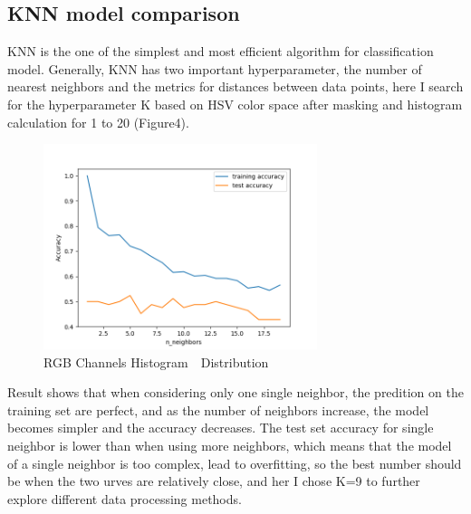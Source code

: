 \documentclass[11pt]{article}
\begin{document}
\subsection{KNN model comparison}
KNN is the one of the simplest and most efficient algorithm for classification model. Generally, KNN has two important hyperparameter, the number of nearest neighbors and the metrics for distances between data points, here I search for the hyperparameter K based on HSV color space after masking and histogram calculation for 1 to 20 (Figure4). 
\begin{center}
\begin{figure}[htb]
\centering 
\includegraphics[width=8cm]{find_hyperparameterK.png}
\caption{RGB Channels Histogram　Distribution}
\end{figure}
\end{center}
Result shows that when considering only one single neighbor, the predition on the training set are perfect, and as the number of neighbors increase, the model becomes simpler and the accuracy decreases. The test set accuracy for single neighbor is lower than when using more neighbors, which means that the model of a single neighbor is too complex, lead to overfitting, so the best number should be when the two urves are relatively close, and her I chose K=9 to further explore different data processing methods.

\begin{table}[htb]
\centering
{}
\caption{KNN model comparison}
\end{table}
\end{document}
